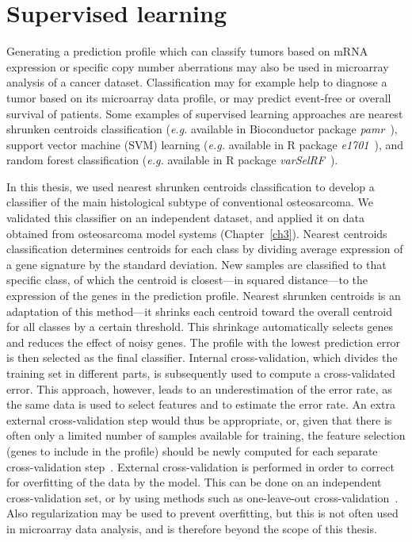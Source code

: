 \section{Supervised learning}\label{supervised1}
Generating a prediction profile which can classify tumors based on mRNA expression or specific copy number aberrations may also be used in microarray analysis of a cancer dataset. Classification may for example help to diagnose a tumor based on its microarray data profile, or may predict event\hyp{}free or overall survival of patients. Some examples of supervised learning approaches are nearest shrunken centroids classification ({\it e.g.} available in Bioconductor package {\it pamr}~\cite{tibshirani2002diagnosis}), support vector machine (SVM) learning ({\it e.g.} available in R package {\it e1701}~\cite{dimitriadou2008misc}), and random forest classification ({\it e.g.} available in R package {\it varSelRF}~\cite{diaz2007genesrf}).

In this thesis, we used nearest shrunken centroids classification to develop a classifier of the main histological subtype of conventional osteosarcoma. We validated this classifier on an independent dataset, and applied it on data obtained from osteosarcoma model systems (Chapter~\ref{ch3}). Nearest centroids classification determines centroids for each class by dividing average expression of a gene signature by the standard deviation. New samples are classified to that specific class, of which the centroid is closest---in squared distance---to the expression of the genes in the prediction profile. Nearest shrunken centroids is an adaptation of this method---it shrinks each centroid toward the overall centroid for all classes by a certain threshold. This shrinkage automatically selects genes and reduces the effect of noisy genes. The profile with the lowest prediction error is then selected as the final classifier. Internal cross\hyp{}validation, which divides the training set in different parts, is subsequently used to compute a cross\hyp{}validated error. This approach, however, leads to an underestimation of the error rate, as the same data is used to select features and to estimate the error rate. An extra external cross\hyp{}validation step would thus be appropriate, or, given that there is often only a limited number of samples available for training, the feature selection (genes to include in the profile) should be newly computed for each separate cross\hyp{}validation step~\cite{wood2007classification,ambroise2002selection}. External cross\hyp{}validation is performed in order to correct for overfitting of the data by the model. This can be done on an independent cross\hyp{}validation set, or by using methods such as one\hyp{}leave\hyp{}out cross\hyp{}validation~\cite{simon2003pitfalls}. Also regularization may be used to prevent overfitting, but this is not often used in microarray data analysis, and is therefore beyond the scope of this thesis.

